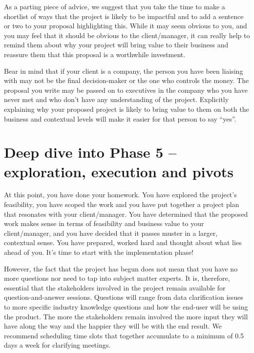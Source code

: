 \documentclass[
]{book}
\begin{document}
As a parting piece of advice, we suggest that you take the time to make a shortlist of ways that the project is likely to be impactful and to add a sentence or two to your proposal highlighting this. While it may seem obvious to you, and you may feel that it should be obvious to the client/manager, it can really help to remind them about why your project will bring value to their business and reassure them that this proposal is a worthwhile investment.

Bear in mind that if your client is a company, the person you have been liaising with may not be the final decision-maker or the one who controls the money. The proposal you write may be passed on to executives in the company who you have never met and who don't have any understanding of the project. Explicitly explaining why your proposed project is likely to bring value to them on both the business and contextual levels will make it easier for that person to say ``yes''.

\hypertarget{deep-dive-into-phase-5-exploration-execution-and-pivots}{%
\chapter{Deep dive into Phase 5 -- exploration, execution and pivots}\label{deep-dive-into-phase-5-exploration-execution-and-pivots}}

At this point, you have done your homework. You have explored the project's feasibility, you have scoped the work and you have put together a project plan that resonates with your client/manager. You have determined that the proposed work makes sense in terms of feasibility and business value to your client/manager, and you have decided that it passes muster in a larger, contextual sense. You have prepared, worked hard and thought about what lies ahead of you. It's time to start with the implementation phase!

However, the fact that the project has begun does not mean that you have no more questions nor need to tap into subject matter experts. It is, therefore, essential that the stakeholders involved in the project remain available for question-and-answer sessions. Questions will range from data clarification issues to more specific industry knowledge questions and how the end-user will be using the product. The more the stakeholders remain involved the more input they will have along the way and the happier they will be with the end result. We recommend scheduling time slots that together accumulate to a minimum of 0.5 days a week for clarifying meetings.
\end{document}
